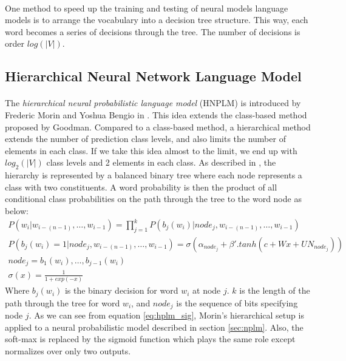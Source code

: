 \paragraph{}
One method to speed up the training and testing of neural models language models is to arrange the vocabulary into a decision tree structure. This way, each word becomes a series of decisions through the tree. The number of decisions is order $log(|V|)$.

\subsection{Hierarchical Neural Network Language Model}
\paragraph{}
The \emph{hierarchical neural probabilistic language model} (HNPLM) is introduced by Frederic Morin and Yoshua Bengio in \cite{MorinBengio2005}. This idea extends the class-based method proposed by Goodman. Compared to a class-based method,  a hierarchical method extends the number of prediction class levels, and also limits the number of elements in each class. If we take this idea almost to the limit, we end up with $log_2(|V|)$ class levels and 2 elements in each class. As described in \cite{MorinBengio2005}, the hierarchy is represented by a balanced binary tree where each node represents a class with two constituents.  A word probability is then the product of all conditional class probabilities on the path through the tree to the word node as below:
\begin{align}
P(w_i | w_{i-(n-1)},\dots, w_{i-1})  =  \prod_{j=1}^{k} P(b_j(w_i)|node_j ,  w_{i-(n-1)},\dots, w_{i-1})
\\P(b_j(w_i)=1|node_j,  w_{i-(n-1)},\dots, w_{i-1}) =  \sigma(\alpha_{node_j} + \beta' . tanh(c+ Wx+ UN_{node_j})) \label{eq:hplm_sig}
\\node_j =b_1(w_i),\dots,b_{j-1}(w_i)
\\ \sigma(x) = \frac{1}{1+exp(-x)}
\end{align}
Where $b_j(w_i)$ is the binary decision for word $w_i$ at node $j$. $k$ is the length of the path through the tree for word $w_i$, and $node_j$ is the sequence of bits specifying node $j$. As we can see from equation \ref{eq:hplm_sig}, Morin's hierarchical setup is applied to a neural probabilistic model described in section \ref{sec:nplm}. Also, the soft-max is replaced by the sigmoid function which plays the same role except normalizes over only two outputs.

